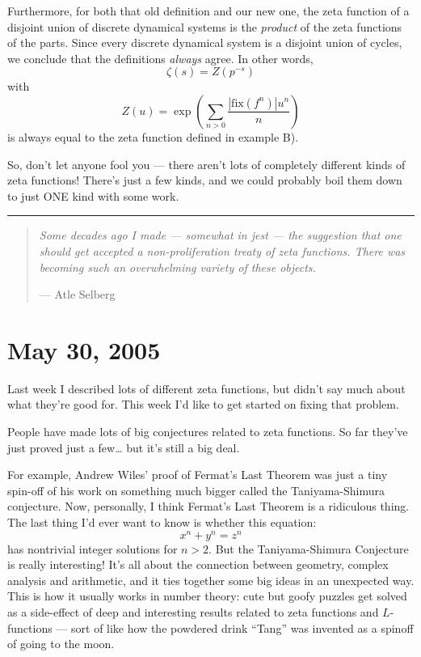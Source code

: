 \documentclass{article}
\begin{document}
Furthermore, for both that old definition and our new one, the zeta
function of a disjoint union of discrete dynamical systems is the
\emph{product} of the zeta functions of the parts. Since every discrete
dynamical system is a disjoint union of cycles, we conclude that the
definitions \emph{always} agree. In other words,
\[\zeta(s) = Z(p^{-s})\] with
\[Z(u) = \exp\left(\sum_{n>0} \frac{|\mathrm{fix}(f^n)| u^n}{n}\right)\]
is always equal to the zeta function defined in example B).

So, don't let anyone fool you --- there aren't lots of completely
different kinds of zeta functions! There's just a few kinds, and we
could probably boil them down to just ONE kind with some work.

\begin{center}\rule{0.5\linewidth}{0.5pt}\end{center}

\begin{quote}
\emph{Some decades ago I made --- somewhat in jest --- the suggestion
that one should get accepted a non-proliferation treaty of zeta
functions. There was becoming such an overwhelming variety of these
objects.}

--- Atle Selberg
\end{quote}



\hypertarget{week217}{%
\section{May 30, 2005}\label{week217}}

Last week I described lots of different zeta functions, but didn't say
much about what they're good for. This week I'd like to get started on
fixing that problem.

People have made lots of big conjectures related to zeta functions. So
far they've just proved just a few\ldots{} but it's still a big deal.

For example, Andrew Wiles' proof of Fermat's Last Theorem was just a
tiny spin-off of his work on something much bigger called the
Taniyama-Shimura conjecture. Now, personally, I think Fermat's Last
Theorem is a ridiculous thing. The last thing I'd ever want to know is
whether this equation: \[x^n + y^n = z^n\] has nontrivial integer
solutions for \(n > 2\). But the Taniyama-Shimura Conjecture is really
interesting! It's all about the connection between geometry, complex
analysis and arithmetic, and it ties together some big ideas in an
unexpected way. This is how it usually works in number theory: cute but
goofy puzzles get solved as a side-effect of deep and interesting
results related to zeta functions and \(L\)-functions --- sort of like
how the powdered drink ``Tang'' was invented as a spinoff of going to
the moon.
\end{document}
